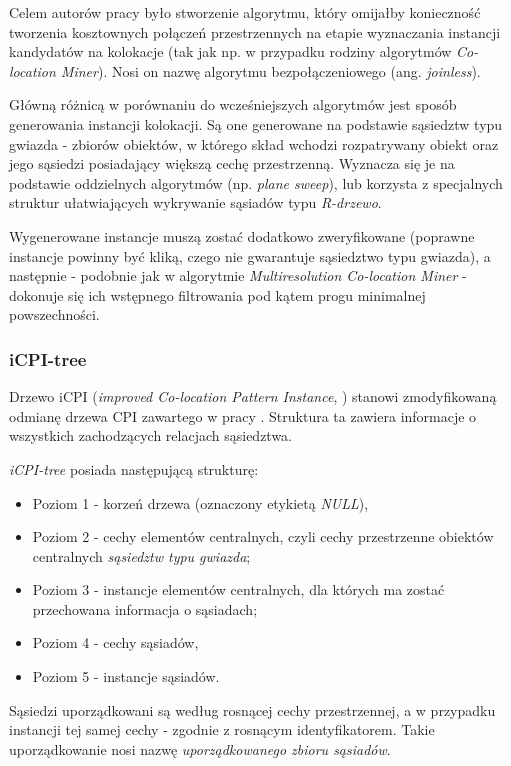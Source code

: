 \documentclass[12pt]{article}
\begin{document}
Celem autorów pracy \cite{joinless} było stworzenie algorytmu, który omijałby konieczność tworzenia kosztownych połączeń przestrzennych na etapie wyznaczania instancji kandydatów na kolokacje (tak jak np. w przypadku rodziny algorytmów \textit{Co-location Miner}). Nosi on nazwę algorytmu bezpołączeniowego (ang. \textit{joinless}).

Główną różnicą w porównaniu do wcześniejszych algorytmów jest sposób generowania instancji kolokacji. Są one generowane na podstawie sąsiedztw typu gwiazda - zbiorów obiektów, w którego skład wchodzi rozpatrywany obiekt oraz jego sąsiedzi posiadający większą cechę przestrzenną. Wyznacza się je na podstawie oddzielnych algorytmów (np. \textit{plane sweep}), lub korzysta z specjalnych struktur ułatwiających wykrywanie sąsiadów typu \textit{R-drzewo}.

Wygenerowane instancje muszą zostać dodatkowo zweryfikowane (poprawne instancje powinny być kliką, czego nie gwarantuje sąsiedztwo typu gwiazda), a następnie - podobnie jak w algorytmie \textit{Multiresolution Co-location Miner} - dokonuje się ich wstępnego filtrowania pod kątem progu minimalnej powszechności.

\subsubsection{iCPI-tree}

Drzewo iCPI (\textit{improved Co-location Pattern Instance}, \cite{icpi}) stanowi zmodyfikowaną odmianę drzewa CPI zawartego w pracy \cite{cpi}. Struktura ta zawiera informacje o wszystkich zachodzących relacjach sąsiedztwa. 

\textit{iCPI-tree} posiada następującą strukturę:

\begin{itemize}
\item Poziom 1 - korzeń drzewa (oznaczony etykietą \textit{NULL}),
\item Poziom 2 - cechy elementów centralnych, czyli cechy przestrzenne obiektów centralnych \textit{sąsiedztw typu gwiazda};
\item Poziom 3 - instancje elementów centralnych, dla których ma zostać przechowana informacja o sąsiadach;
\item Poziom 4 - cechy sąsiadów,
\item Poziom 5 - instancje sąsiadów.
\end{itemize}

Sąsiedzi uporządkowani są według rosnącej cechy przestrzennej, a w przypadku instancji tej samej cechy - zgodnie z rosnącym identyfikatorem. Takie uporządkowanie nosi nazwę \textit{uporządkowanego zbioru sąsiadów}.
\end{document}
